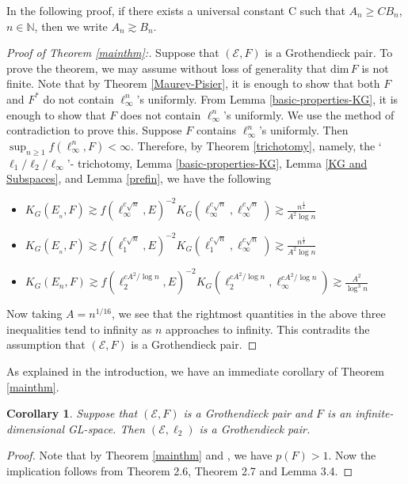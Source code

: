 \documentclass[a4paper,oneside,11pt, reqno]{amsart}
\numberwithin{equation}{section}
\newtheorem{corollary}[theorem]{Corollary}
\theoremstyle{plain}
\begin{document}
	In the following proof, if there exists a universal constant C such that $A_n \geqslant C B_n$, $n\in \mathbb{N}$,  then we write $A_n \gtrsim  B_n$.
\begin{proof}[{Proof of Theorem \ref{mainthm}}:] Suppose that $(\mathcal E, F)$  is a Grothendieck pair. To prove the theorem, we may assume without loss of generality that $\text{dim}\,F$ is not finite.
	Note that by Theorem \ref{Maurey-Pisier}, it is enough to show that both $F$ and $F^*$ do not contain $\ell_\infty^n$'s uniformly. From Lemma \ref{basic-properties-KG}, it is enough to show that $F$ does not contain $\ell_\infty^n$'s uniformly. We use the method of contradiction to prove this. Suppose $F$ contains $\ell_\infty^n$'s uniformly. Then  $\sup_{n\geqslant 1}f(\ell_\infty^n, F)<\infty.$ Therefore, by Theorem \ref{trichotomy}, namely, the `$\ell_1/\ell_2/\ell_\infty$'-  trichotomy, Lemma \ref{basic-properties-KG}, Lemma \ref{KG and Subspaces}, and Lemma \ref{prefin},  we have the following 
	\begin{itemize}
\item[(i)]$K_G(E_{_n},F)\gtrsim f(\ell_\infty^{c\sqrt{n}},E)^{-2}K_G(\ell_\infty^{c\sqrt{n}},\ell_\infty^{c\sqrt{n}}){\gtrsim}\frac{n^{\frac{1}{4}}}{A^2{\log n}}$ 
	\item[(ii)] $K_G(E_{_n},F)\gtrsim f(\ell_1^{c\sqrt{n}},E)^{-2}K_G(\ell_1^{c\sqrt{n}},\ell_\infty^{c\sqrt{n}})\gtrsim\frac{n^{\frac{1}{4}}}{A^2{\log n}}$
	\item[(iii)] $K_G(E_n,F)\gtrsim f(\ell_2^{cA^2/\log{n}},E)^{-2}K_G(\ell_2^{cA^2/\log{n}},\ell_\infty^{cA^2/\log{n}})\gtrsim\frac{A^2}{\log^3n}$
	\end{itemize}
Now taking $A=n^{1/16}$, we see that the rightmost quantities in the above three inequalities tend to infinity as $n$ approaches to infinity. This contradits the assumption that $(\mathcal E, F)$  is a Grothendieck pair.
\end{proof}	
As explained in the introduction, we have an immediate corollary of Theorem \ref{mainthm}. 
\begin{corollary}%
Suppose that  $(\mathcal E, F)$  is a Grothendieck pair and $F$ is an infinite-dimensional GL-space.
Then $(\mathcal E, \ell_2)$ is a Grothendieck pair.
\end{corollary}
\begin{proof}
    Note that by Theorem \ref{mainthm} and \cite[Theorem 17.13]{DJT}, we have $p(F)>1.$ Now the implication follows from Theorem 2.6, Theorem 2.7 and Lemma 3.4.
\end{proof}
\end{document}
